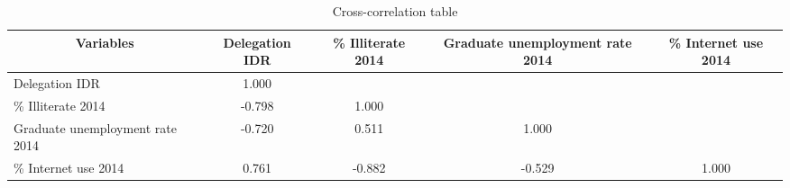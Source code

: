 \begin{table}[htbp]\centering \caption{Cross-correlation table\label{corrtable}}
\begin{tabular}{l  c  c  c  c }\hline\hline
\multicolumn{1}{c}{Variables} &Delegation IDR&\% Illiterate 2014&Graduate unemployment rate 2014&\% Internet use 2014\\ \hline
Delegation IDR&1.000\\
\% Illiterate 2014&-0.798&1.000\\
Graduate unemployment rate 2014&-0.720&0.511&1.000\\
\% Internet use 2014&0.761&-0.882&-0.529&1.000\\
\hline \hline 
 \end{tabular}
\end{table}
